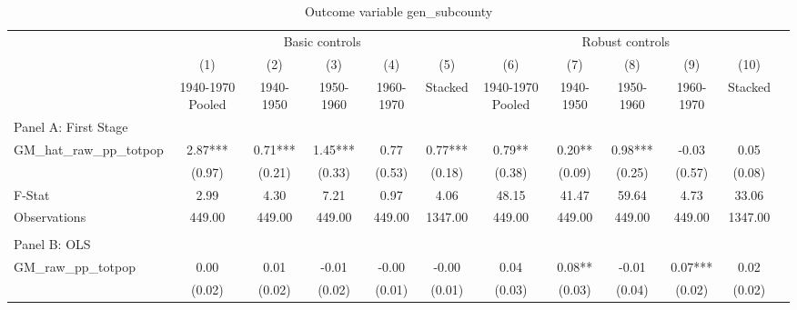  \begin{table}[htbp]\centering {} \begin{threeparttable} \caption{Outcome variable gen\_subcounty} \begin{tabular}{l*{11}{c}} \toprule
          &\multicolumn{5}{c}{Basic controls}                                   &\multicolumn{5}{c}{Robust controls}                                  \\\cmidrule(lr){2-6}\cmidrule(lr){7-11}
          &\multicolumn{1}{c}{(1)}&\multicolumn{1}{c}{(2)}&\multicolumn{1}{c}{(3)}&\multicolumn{1}{c}{(4)}&\multicolumn{1}{c}{(5)}&\multicolumn{1}{c}{(6)}&\multicolumn{1}{c}{(7)}&\multicolumn{1}{c}{(8)}&\multicolumn{1}{c}{(9)}&\multicolumn{1}{c}{(10)}\\
          &\multicolumn{1}{c}{1940-1970 Pooled}&\multicolumn{1}{c}{1940-1950}&\multicolumn{1}{c}{1950-1960}&\multicolumn{1}{c}{1960-1970}&\multicolumn{1}{c}{Stacked}&\multicolumn{1}{c}{1940-1970 Pooled}&\multicolumn{1}{c}{1940-1950}&\multicolumn{1}{c}{1950-1960}&\multicolumn{1}{c}{1960-1970}&\multicolumn{1}{c}{Stacked}\\
\cmidrule(lr){1-11}
\multicolumn{10}{l}{Panel A: First Stage}\\
\cmidrule(lr){1-11}
GM\_hat\_raw\_pp\_totpop&      2.87***&      0.71***&      1.45***&      0.77   &      0.77***&      0.79** &      0.20** &      0.98***&     -0.03   &      0.05   \\
          &    (0.97)   &    (0.21)   &    (0.33)   &    (0.53)   &    (0.18)   &    (0.38)   &    (0.09)   &    (0.25)   &    (0.57)   &    (0.08)   \\
\midrule
F-Stat    &      2.99   &      4.30   &      7.21   &      0.97   &      4.06   &     48.15   &     41.47   &     59.64   &      4.73   &     33.06   \\
Observations&    449.00   &    449.00   &    449.00   &    449.00   &   1347.00   &    449.00   &    449.00   &    449.00   &    449.00   &   1347.00   \\
\cmidrule[\heavyrulewidth](lr){1-11} \\ \cmidrule[\heavyrulewidth](lr){1-11}
\multicolumn{10}{l}{Panel B: OLS}\\
\cmidrule(lr){1-11}
GM\_raw\_pp\_totpop&      0.00   &      0.01   &     -0.01   &     -0.00   &     -0.00   &      0.04   &      0.08** &     -0.01   &      0.07***&      0.02   \\
          &    (0.02)   &    (0.02)   &    (0.02)   &    (0.01)   &    (0.01)   &    (0.03)   &    (0.03)   &    (0.04)   &    (0.02)   &    (0.02)   \\

\end{tabular}
\end{threeparttable}
\end{table}
